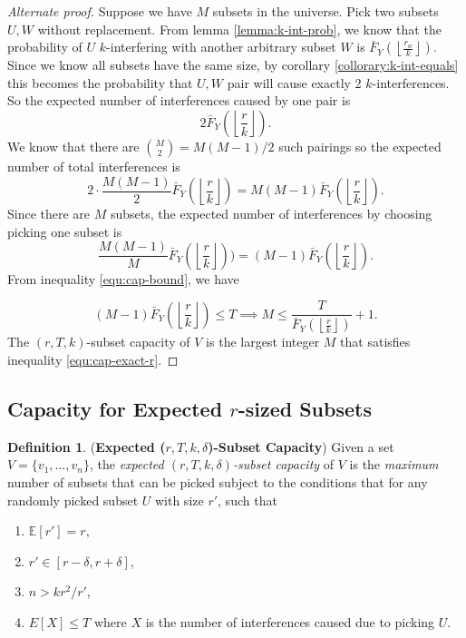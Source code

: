 \documentclass[10pt]{extarticle}
\theoremstyle{definition}
\newtheorem{definition}[theorem]{Definition}
\begin{document}
\begin{proof}[Alternate proof]
    Suppose we have $M$ subsets in the universe. Pick two subsets $U,W$ without replacement. From lemma \ref{lemma:k-int-prob}, we know that the probability of $U$ $k$-interfering with another arbitrary subset $W$ is $\bar{F}_Y\left(\left\lfloor \frac{r_w}{k} \right\rfloor\right)$. Since we know all subsets have the same size, by corollary \ref{collorary:k-int-equals} this becomes the probability that $U,W$ pair will cause exactly 2 $k$-interferences. So the expected number of interferences caused by one pair is
    $$
    2\bar{F}_Y\left(\left\lfloor \frac{r}{k} \right\rfloor\right).
    $$
    We know that there are $\binom{M}{2} = M(M-1)/2$ such pairings so the expected number of total interferences is
    $$
    2 \cdot \frac{M(M-1)}{2} \bar{F}_Y\left(\left\lfloor \frac{r}{k} \right\rfloor\right)  =  M(M-1) \bar{F}_Y\left(\left\lfloor \frac{r}{k} \right\rfloor\right). 
    $$
    Since there are $M$ subsets, the expected number of interferences by choosing picking one subset is
    $$
    \frac{M(M-1)}{M} \bar{F}_Y\left(\left\lfloor \frac{r}{k} \right\rfloor\right))  = (M-1) \bar{F}_Y\left(\left\lfloor \frac{r}{k} \right\rfloor\right).
    $$
    From inequality \ref{equ:cap-bound}, we have 

    \begin{equation*}
        (M-1) \bar{F}_Y\left(\left\lfloor \frac{r}{k} \right\rfloor\right) \le T \implies M \le \frac{T}{\bar{F}_Y\left(\left\lfloor \frac{r}{k} \right\rfloor\right)} + 1.
    \end{equation*}
The $(r,T,k)$-subset capacity of $V$ is the largest integer $M$ that satisfies inequality \ref{equ:cap-exact-r}.
\end{proof}

\subsection{Capacity for Expected $r$-sized Subsets}

\begin{definition} (\textbf{Expected (\textit{$r,T,k,\delta$})-Subset Capacity}) Given a set $V = \{v_1,...,v_n\}$, the \textit{expected $(r,T,k,\delta)$-subset capacity} of $V$ is the \textit{maximum} number of subsets that can be picked subject to the conditions that for any randomly picked subset $U$ with size $r'$, such that
    \begin{enumerate}
        \item $\mathbb{E}[r'] = r$,
        \item $r' \in [r-\delta,r+\delta]$,
        \item $n > kr^2/r'$,
        \item \label{equ:cap-bound-expected}$E[X] \le T$ where $X$ is the number of interferences caused due to picking $U$. 
    \end{enumerate}
    \end{definition}
\end{document}
